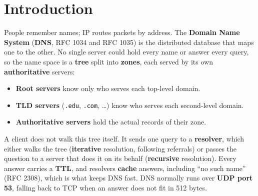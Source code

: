\documentclass[11pt,a4paper]{article}
\begin{document}
\section{Introduction}
\noindent People remember names; IP routes packets by address. The \textbf{Domain Name System} (\textbf{DNS}, RFC 1034 and RFC 1035) is the distributed database that maps one to the other. No single server could hold every name or answer every query, so the name space is a \textbf{tree} split into \textbf{zones}, each served by its own \textbf{authoritative} servers:
\begin{itemize}[leftmargin=2em]
    \item \textbf{Root servers} know only who serves each top-level domain.
    \item \textbf{TLD servers} (\texttt{.edu}, \texttt{.com}, \ldots) know who serves each second-level domain.
    \item \textbf{Authoritative servers} hold the actual records of their zone.
\end{itemize}
A client does not walk this tree itself. It sends one query to a \textbf{resolver}, which either walks the tree (\textbf{iterative} resolution, following referrals) or passes the question to a server that does it on its behalf (\textbf{recursive} resolution). Every answer carries a \textbf{TTL}, and resolvers \textbf{cache} answers, including ``no such name'' (RFC 2308), which is what keeps DNS fast. DNS normally runs over \textbf{UDP port 53}, falling back to TCP when an answer does not fit in 512 bytes.
\end{document}
